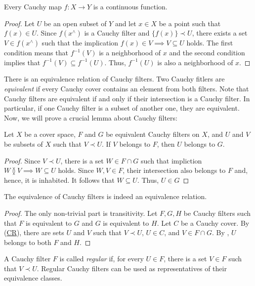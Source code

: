\documentclass[reqno]{amsart}
\newcommand{\axref}[1]{(\hyperref[ax:#1]{#1})}
\theoremstyle{definition}
\theoremstyle{remark}
\numberwithin{figure}{section}
\newcommand{\overlap}[2]{#1 \between #2}
\newcommand{\rb}{\prec}
\begin{document}
\begin{prop}
Every Cauchy map $f : X \to Y$ is a continuous function.
\end{prop}
\begin{proof}
Let $U$ be an open subset of $Y$ and let $x \in X$ be a point such that $f(x) \in U$.
Since $f(x^\wedge)$ is a Cauchy filter and $\{ f(x) \} \rb U$, there exists a set $V \in f(x^\wedge)$ such that the implication $f(x) \in V \implies V \subseteq U$ holds.
The first condition means that $f^{-1}(V)$ is a neighborhood of $x$ and the second condition implies that $f^{-1}(V) \subseteq f^{-1}(U)$.
Thus, $f^{-1}(U)$ is also a neighborhood of $x$.
\end{proof}

There is an equivalence relation of Cauchy filters.
Two Cauchy fitlers are \emph{equivalent} if every Cauchy cover contains an element from both filters.
Note that Cauchy filters are equivalent if and only if their intersection is a Cauchy filter.
In particular, if one Cauchy filter is a subset of another one, they are equivalent.
Now, we will prove a crucial lemma about Cauchy filters:

\begin{lem}
Let $X$ be a cover space, $F$ and $G$ be equivalent Cauchy filters on $X$, and $U$ and $V$ be subsets of $X$ such that $V \rb U$.
If $V$ belongs to $F$, then $U$ belongs to $G$.
\end{lem}
\begin{proof}
Since $V \rb U$, there is a set $W \in F \cap G$ such that impliction $\overlap{W}{V} \implies W \subseteq U$ holds.
Since $W,V \in F$, their intersection also belongs to $F$ and, hence, it is inhabited.
It follows that $W \subseteq U$.
Thus, $U \in G$
\end{proof}

\begin{prop}
The equivalence of Cauchy filters is indeed an equivalence relation.
\end{prop}
\begin{proof}
The only non-trivial part is transitivity.
Let $F,G,H$ be Cauchy filters such that $F$ is equivalent to $G$ and $G$ is equivalent to $H$.
Let $C$ be a Cauchy cover.
By \axref{CR}, there are sets $U$ and $V$ such that $V \rb U$, $U \in C$, and $V \in F \cap G$.
By , $U$ belongs to both $F$ and $H$.
\end{proof}

A Cauchy filter $F$ is called \emph{regular} if, for every $U \in F$, there is a set $V \in F$ such that $V \rb U$.
Regular Cauchy filters can be used as representatives of their equivalence classes.
\end{document}
